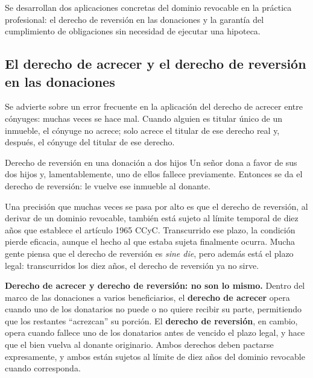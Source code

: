 \documentclass[12pt,oneside]{book}
\begin{document}
Se desarrollan dos aplicaciones concretas del dominio revocable en la práctica profesional: el derecho de reversión en las donaciones y la garantía del cumplimiento de obligaciones sin necesidad de ejecutar una hipoteca.

\subsection{El derecho de acrecer y el derecho de reversión en las donaciones}

Se advierte sobre un error frecuente en la aplicación del derecho de acrecer entre cónyuges: muchas veces se hace mal. Cuando alguien es titular único de un inmueble, el cónyuge no acrece; solo acrece el titular de ese derecho real y, después, el cónyuge del titular de ese derecho.

\begin{example}{Derecho de reversión en una donación a dos hijos}
Un señor dona a favor de sus dos hijos y, lamentablemente, uno de ellos fallece previamente. Entonces se da el derecho de reversión: le vuelve ese inmueble al donante.

Una precisión que muchas veces se pasa por alto es que el derecho de reversión, al derivar de un dominio revocable, también está sujeto al límite temporal de diez años que establece el artículo 1965 CCyC. Transcurrido ese plazo, la condición pierde eficacia, aunque el hecho al que estaba sujeta finalmente ocurra. Mucha gente piensa que el derecho de reversión es \emph{sine die}, pero además está el plazo legal: transcurridos los diez años, el derecho de reversión ya no sirve.
\end{example}

\begin{note}
\textbf{Derecho de acrecer y derecho de reversión: no son lo mismo.} Dentro del marco de las donaciones a varios beneficiarios, el \textbf{derecho de acrecer} opera cuando uno de los donatarios no puede o no quiere recibir su parte, permitiendo que los restantes ``acrezcan'' su porción. El \textbf{derecho de reversión}, en cambio, opera cuando fallece uno de los donatarios antes de vencido el plazo legal, y hace que el bien vuelva al donante originario. Ambos derechos deben pactarse expresamente, y ambos están sujetos al límite de diez años del dominio revocable cuando corresponda.
\end{note}
\end{document}
